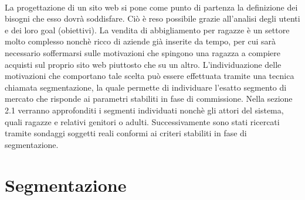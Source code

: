 \documentclass[12pt,a4paper]{report}
\begin{document}
\paragraph{}La progettazione di un sito web si pone come punto di partenza la definizione dei bisogni che esso dovrà soddisfare. Ciò è reso possibile grazie all'analisi degli utenti e dei loro goal (obiettivi). La vendita di abbigliamento per ragazze è un settore molto complesso nonchè ricco di aziende già inserite da tempo, per cui sarà necessario soffermarsi sulle motivazioni che spingono una ragazza a compiere acquisti sul proprio sito web piuttosto che su un altro. L'individuazione delle motivazioni che comportano tale scelta può essere effettuata tramite una tecnica chiamata segmentazione, la quale permette di individuare l'esatto segmento di mercato che risponde ai parametri stabiliti in fase di commissione. Nella sezione 2.1 verranno approfonditi i segmenti individuati nonchè gli attori del sistema, quali ragazze e relativi genitori o adulti. Successivamente sono stati ricercati tramite sondaggi soggetti reali conformi ai criteri stabiliti in fase di segmentazione.
\section{Segmentazione}
\end{document}
